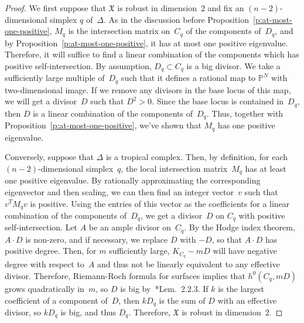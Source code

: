 \documentclass[11pt,reqno]{amsart}
\theoremstyle{definition}
\newcommand{\PP}{\mathbb P}
\newcommand{\X}{\mathfrak X}
\begin{document}
\begin{proof}
We first suppose that $\X$ is robust in dimension~$2$ and fix an
$(n-2)$-dimensional simplex $q$ of~$\Delta$. As in the discussion before
Proposition~\ref{p:at-most-one-positive}, $M_q$ is the intersection matrix
on~$C_q$ of the components of~$D_q$, and by
Proposition~\ref{p:at-most-one-positive}, it has at most one positive
eigenvalue. Therefore, it will suffice to find a linear combination of the
components which has positive self-intersection. By assumption, $D_q \subset
C_q$ is a big divisor. We take a sufficiently large multiple of~$D_q$ such that
it defines a rational map to $\PP^N$ with two-dimensional image. If we remove
any divisors in the base locus of this map, we will get a divisor~$D$ such that
$D^2 > 0$. Since the base locus is contained in~$D_q$, then $D$ is a linear
combination of the components of~$D_q$. Thus, together with
Proposition~\ref{p:at-most-one-positive}, we've shown that $M_q$ has one
positive eigenvalue.

Conversely, suppose that $\Delta$ is a tropical complex. Then, by definition,
for each $(n-2)$-dimensional simplex~$q$, the local intersection matrix~$M_q$
has at least one positive eigenvalue. By rationally approximating the
corresponding eigenvector and then scaling, we can then find an integer
vector~$v$ such that $v^T M_q v$ is positive. Using the entries of this vector
as the coefficients for a linear combination of the components of~$D_q$, we get
a divisor~$D$ on $C_q$ with positive self-intersection. Let $A$ be an ample
divisor on~$C_q$. By the Hodge index theorem, $A \cdot D$ is non-zero, and if
necessary, we replace $D$ with $-D$, so that $A \cdot D$ has positive degree.
Then, for $m$ sufficiently large, $K_{C_q}-mD$ will have negative degree with
respect to~$A$ and thus not be linearly equivalent to any effective divisor.
Therefore, Riemann-Roch formula for surfaces implies that $h^0(C_q, mD)$ grows
quadratically in~$m$, so $D$ is big by~\cite{lazarsfeld}*{Lem.~2.2.3}. If $k$ is
the largest coefficient of a component of~$D$, then $kD_q$ is the sum of $D$
with an effective divisor, so $kD_q$ is big, and thus $D_q$. Therefore, $\X$ is
robust in dimension~$2$.
\end{proof}
\end{document}
